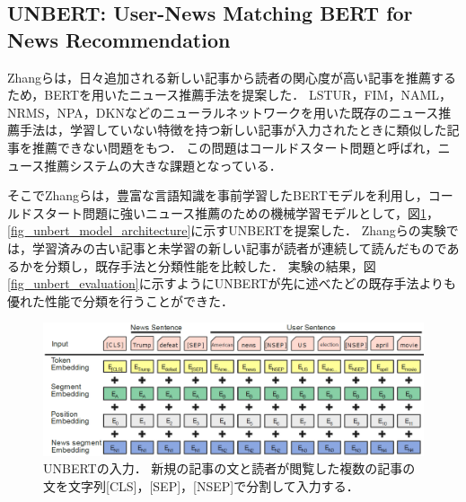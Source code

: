 \documentclass[12pt,a4j]{jreport}
\begin{document}

\subsection{UNBERT: User-News Matching BERT for News Recommendation}
Zhangらは，日々追加される新しい記事から読者の関心度が高い記事を推薦するため，BERTを用いたニュース推薦手法を提案した\cite{zhang_unbert_2021}．
LSTUR，FIM，NAML，NRMS，NPA，DKNなどのニューラルネットワークを用いた既存のニュース推薦手法は，学習していない特徴を持つ新しい記事が入力されたときに類似した記事を推薦できない問題をもつ．
この問題はコールドスタート問題と呼ばれ，ニュース推薦システムの大きな課題となっている．

そこでZhangらは，豊富な言語知識を事前学習したBERTモデルを利用し，コールドスタート問題に強いニュース推薦のための機械学習モデルとして，図\ref{fig_unbert_inputs}，\ref{fig_unbert_model_architecture}に示すUNBERTを提案した．
Zhangらの実験では，学習済みの古い記事と未学習の新しい記事が読者が連続して読んだものであるかを分類し，既存手法と分類性能を比較した．
実験の結果，図\ref{fig_unbert_evaluation}に示すようにUNBERTが先に述べたどの既存手法よりも優れた性能で分類を行うことができた．

\begin{figure}[H]
	\centering
	\includegraphics[keepaspectratio, width=120mm]{img/unbert_inputs.png}
	\caption{
    UNBERTの入力．
    \protect\footnotemark[10]
    新規の記事の文と読者が閲覧した複数の記事の文を文字列[CLS]，[SEP]，[NSEP]で分割して入力する．
  }
	\label{fig_unbert_inputs}
\end{figure}
\end{document}
